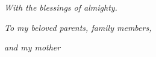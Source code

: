 \thispagestyle{empty}

{\large 
\vskip 0.32cm
\centerline{\huge \bf  }
\vskip 2.5in
\centerline{\Large \textit{With the blessings of almighty.   }}

	\centerline{\large \textit{To my beloved parents, family members,}}
          	\centerline{\large \textit{and my mother}}
}




